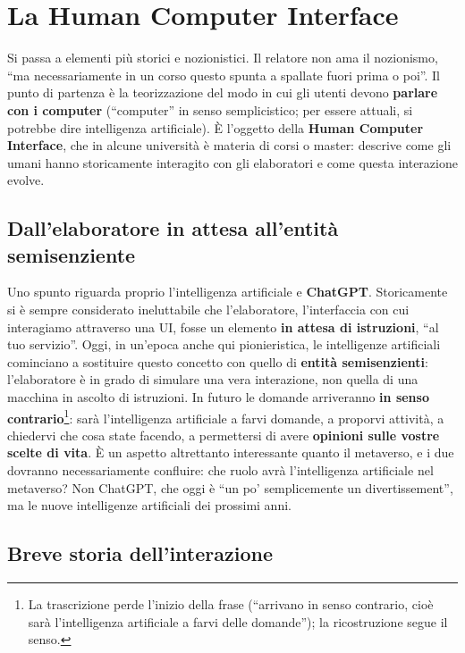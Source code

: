 \section{La Human Computer Interface}
\label{z8:sec:hci}

Si passa a elementi più storici e nozionistici. Il relatore non ama il
nozionismo, ``ma necessariamente in un corso questo spunta a spallate fuori
prima o poi''. Il punto di partenza è la teorizzazione del modo in cui gli
utenti devono \textbf{parlare con i computer} (``computer'' in senso
semplicistico; per essere attuali, si potrebbe dire intelligenza artificiale).
È l'oggetto della \textbf{Human Computer Interface}, che in alcune università è
materia di corsi o master: descrive come gli umani hanno storicamente interagito
con gli elaboratori e come questa interazione evolve.

\subsection{Dall'elaboratore in attesa all'entità semisenziente}

Uno spunto riguarda proprio l'intelligenza artificiale e \textbf{ChatGPT}.
Storicamente si è sempre considerato ineluttabile che l'elaboratore, l'interfaccia
con cui interagiamo attraverso una UI, fosse un elemento \textbf{in attesa di
istruzioni}, ``al tuo servizio''. Oggi, in un'epoca anche qui pionieristica, le
intelligenze artificiali cominciano a sostituire questo concetto con quello di
\textbf{entità semisenzienti}: l'elaboratore è in grado di simulare una vera
interazione, non quella di una macchina in ascolto di istruzioni. In futuro le
domande arriveranno \textbf{in senso contrario}\footnote{La trascrizione perde
l'inizio della frase (``arrivano in senso contrario, cioè sarà l'intelligenza
artificiale a farvi delle domande''); la ricostruzione segue il senso.}: sarà
l'intelligenza artificiale a farvi domande, a proporvi attività, a chiedervi
che cosa state facendo, a permettersi di avere \textbf{opinioni sulle vostre
scelte di vita}. È un aspetto altrettanto interessante quanto il metaverso, e i
due dovranno necessariamente confluire: che ruolo avrà l'intelligenza
artificiale nel metaverso? Non ChatGPT, che oggi è ``un po' semplicemente un
divertissement'', ma le nuove intelligenze artificiali dei prossimi anni.

\subsection{Breve storia dell'interazione}

